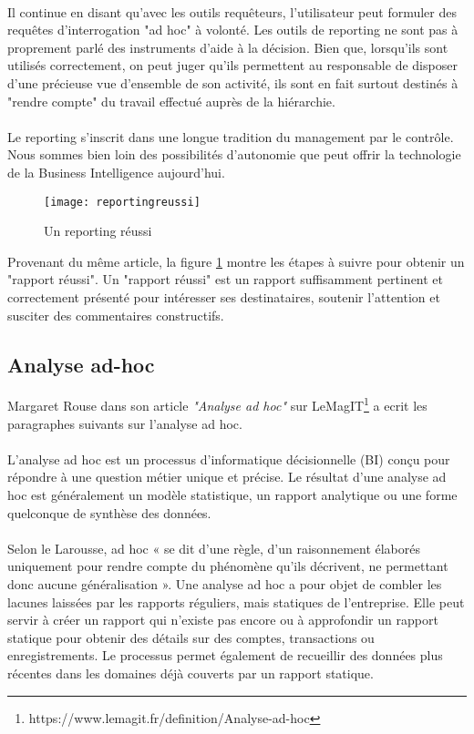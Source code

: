 \paragraph{}
Il continue en disant qu'avec les outils requêteurs, l'utilisateur peut formuler des requêtes d'interrogation "ad hoc" à volonté. Les outils de reporting ne sont pas à proprement parlé des instruments d'aide à la décision. Bien que, lorsqu'ils sont utilisés correctement, on peut juger qu'ils permettent au responsable de disposer d'une précieuse vue d'ensemble de son activité, ils sont en fait surtout destinés à "rendre compte" du travail effectué auprès de la hiérarchie. 
\paragraph{}
Le reporting s'inscrit dans une longue tradition du management par le contrôle. Nous sommes bien loin des possibilités d'autonomie que peut offrir la technologie de la Business Intelligence aujourd'hui.

\begin{figure}[H]
    \centering
    \texttt{[image: reportingreussi]}
    \caption{Un reporting réussi}
    \label{fig:reportingreussi}
\end{figure}

Provenant du même article, la figure \ref{fig:reportingreussi} montre les étapes à suivre pour obtenir un "rapport réussi". Un "rapport réussi" est un rapport suffisamment pertinent et correctement présenté pour intéresser ses destinataires, soutenir l'attention et susciter des commentaires constructifs.

\subsection{Analyse ad-hoc}
Margaret Rouse dans son article \textit{"Analyse ad hoc"} sur LeMagIT\footnote{https://www.lemagit.fr/definition/Analyse-ad-hoc} a ecrit les paragraphes suivants sur l'analyse ad hoc.
\paragraph{}
L'analyse ad hoc est un processus d'informatique décisionnelle (BI) conçu pour répondre à une question métier unique et précise. Le résultat d'une analyse ad hoc est généralement un modèle statistique, un rapport analytique ou une forme quelconque de synthèse des données. 
\paragraph{}
Selon le Larousse, ad hoc « se dit d'une règle, d'un raisonnement élaborés uniquement pour rendre compte du phénomène qu'ils décrivent, ne permettant donc aucune généralisation ». Une analyse ad hoc a pour objet de combler les lacunes laissées par les rapports réguliers, mais statiques de l'entreprise. Elle peut servir à créer un rapport qui n'existe pas encore ou à approfondir un rapport statique pour obtenir des détails sur des comptes, transactions ou enregistrements. Le processus permet également de recueillir des données plus récentes dans les domaines déjà couverts par un rapport statique.
